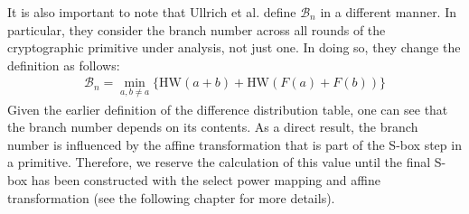 It is also important to note that Ullrich et al. \cite{Ullrich11-1} define $\mathcal{B}_n$ in a different manner. In particular, they consider the branch number across all rounds of the cryptographic primitive under analysis, not just one. In doing so, they change the definition as follows:
\begin{align*}
\mathcal{B}_n = \min_{a, b \not= a}\{\text{HW}(a + b) + \text{HW}(F(a) + F(b)) \}
\end{align*}
Given the earlier definition of the difference distribution table, one can see that the branch number depends on its contents. As a direct result, the branch number is influenced by the affine transformation that is part of the S-box step in a primitive. Therefore, we reserve the calculation of this value until the final S-box has been constructed with the select power mapping and affine transformation (see the following chapter for more details). 




